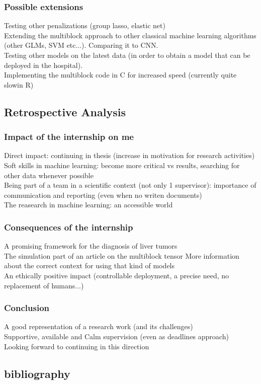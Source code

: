 \documentclass{beamer}
\begin{document}
\begin{frame}
    \frametitle{Possible extensions}
    Testing other penalizations (group lasso, elastic net)\\[10 pt]
    Extending the multiblock approach to other classical machine learning algorithms (other GLMs, SVM etc...). Comparing it to CNN.\\[10 pt]
    Testing other models on the latest data (in order to obtain a model that can be deployed in the hospital).\\[10 pt]
    Implementing the multiblock code in C for increased speed (currently quite slowin R)
\end{frame}

\begin{frame}
    \section{Retrospective Analysis}
\end{frame}

\begin{frame}
    \frametitle{Impact of the internship on me}
    Direct impact: continuing in thesis (increase in motivation for research activities)\\[10 pt]
    Soft skills in machine learning: become more critical vs results, searching for other data whenever possible\\[10 pt]
    Being part of a team in a scientific context (not only 1 supervisor): importance of communication and reporting (even when no writen documents)\\[10 pt]
    The reasearch in machine learning: an accessible world
\end{frame}


\begin{frame}
    \frametitle{Consequences of the internship}
    A promising framework for the diagnosis of liver tumors\\[10 pt]
    The simulation part of an article on the multiblock tensor 
    More information about the correct context for using that kind of models\\[10 pt]
    An ethically positive impact (controllable deployment, a precise need, no replacement of humans...)
    
\end{frame}

\begin{frame}
    \frametitle{Conclusion}
    A good representation of a research work (and its challenges)\\[10 pt]
    Supportive, available and Calm supervision (even as deadlines approach)\\[10 pt]
    Looking forward to continuing in this direction
\end{frame}

\begin{frame}
\section*{bibliography}
\end{frame}


\begin{frame}[allowframebreaks] 
    
     
    \end{frame}
\end{document}
